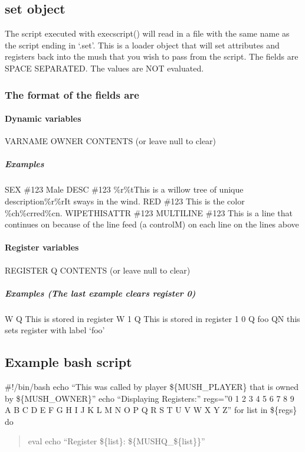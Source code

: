 \documentclass[letterpaper,10pt,english]{sphinxmanual}
\begin{document}
\subsection{set object}
\label{\detokenize{advanced:set-object}}
\sphinxAtStartPar
The script executed with execscript() will read in a file with the same name
as the script ending in ‘.set’.  This is a loader object that will set attributes
and registers back into the mush that you wish to pass from the script. The
fields are SPACE SEPARATED.  The values are NOT evaluated.


\subsubsection{The format of the fields are}
\label{\detokenize{advanced:the-format-of-the-fields-are}}

\paragraph{Dynamic variables}
\label{\detokenize{advanced:id65}}
\sphinxAtStartPar
VARNAME        OWNER        CONTENTS (or leave null to clear)


\subparagraph{Examples}
\label{\detokenize{advanced:examples}}
\sphinxAtStartPar
SEX \#123 Male
DESC \#123 \%r\%tThis is a willow tree of unique description\%r\%rIt sways in the wind.
RED \#123 This is the color \%ch\%crred\%cn.
WIPETHISATTR \#123
MULTILINE \#123 This is a line
that continues on
because of the line feed (a control\sphinxhyphen{}M) on each line
on the lines above


\paragraph{Register variables}
\label{\detokenize{advanced:id66}}
\sphinxAtStartPar
REGISTER       Q            CONTENTS (or leave null to clear)


\subparagraph{Examples (The last example clears register 0)}
\label{\detokenize{advanced:examples-the-last-example-clears-register-0}}
\sphinxAtStartPar
W Q This is stored in register W
1 Q This is stored in register 1
0 Q
foo QN this sets register with label ‘foo’


\subsection{Example bash script}
\label{\detokenize{advanced:example-bash-script}}
\sphinxAtStartPar
\#!/bin/bash
echo “This was called by player \$\{MUSH\_PLAYER\} that is owned by \$\{MUSH\_OWNER\}”
echo “Displaying Registers:”
regs=”0 1 2 3 4 5 6 7 8 9 A B C D E F G H I J K L M N O P Q R S T U V W X Y Z”
for list in \$\{regs\}
do
\begin{quote}

\sphinxAtStartPar
eval echo “Register \$\{list\}: \$\{MUSHQ\_\$\{list\}\}”
\end{quote}
\end{document}

